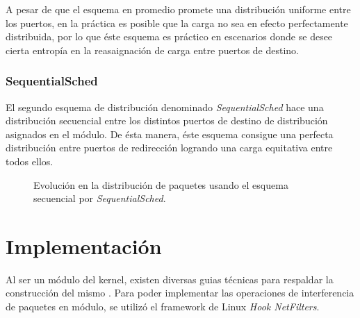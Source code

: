 A pesar de que el esquema en promedio promete una distribución uniforme entre los puertos, en la práctica es posible que la carga no sea en efecto perfectamente distribuida, por lo que éste esquema es práctico en escenarios donde se desee cierta entropía en la reasaignación de carga entre puertos de destino.

\subsubsection{SequentialSched}
El segundo esquema de distribución denominado \emph{SequentialSched} hace una distribución secuencial entre los distintos puertos de destino de distribución asignados en el módulo. De ésta manera, éste esquema consigue una perfecta distribución entre puertos de redirección logrando una carga equitativa entre todos ellos.

\begin{figure}[th!]
\centering
{}
\caption{Evolución en la distribución de paquetes usando el esquema secuencial por \emph{SequentialSched}.}
\label{fig:SequentialSched}
\end{figure}

\section{Implementación}
Al ser un módulo del kernel, existen diversas guias técnicas para respaldar la construcción del mismo \cite{algunawea}. Para poder implementar las operaciones de interferencia de paquetes en módulo, se utilizó el framework de Linux \emph{Hook NetFilters}.

